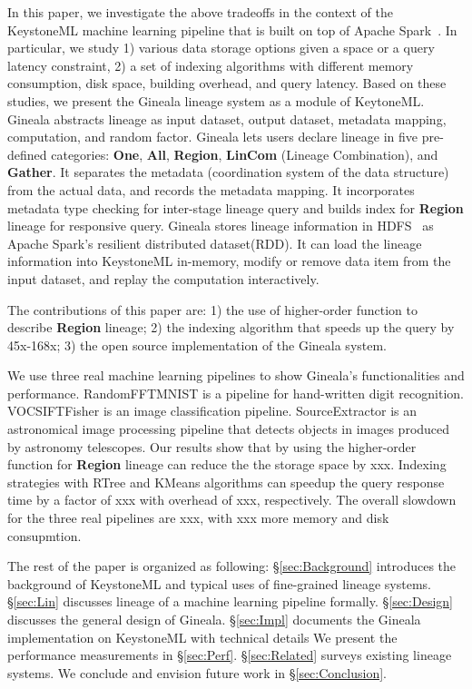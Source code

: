 \documentclass{sig-alternate}
\begin{document}
In this paper, we investigate the above tradeoffs in the context of the KeystoneML machine learning pipeline that is built on
top of Apache Spark~\cite{zaharia12}. In particular, we study 1) various data storage options given a space or a query latency constraint, 
2) a set of indexing algorithms with different memory consumption, disk space, building overhead, and query latency.
Based on these studies, we present the Gineala lineage system as a module of KeytoneML. 
Gineala abstracts lineage as input dataset, output dataset, metadata mapping, computation, and random factor. 
Gineala lets users declare lineage in five pre-defined categories: {\bf One}, {\bf All}, {\bf Region}, {\bf LinCom} (Lineage Combination), and {\bf Gather}.
It separates the metadata (coordination system of the data structure) from the actual data, and records the metadata mapping. 
It incorporates metadata type checking for inter-stage lineage query and builds index for {\bf Region} lineage for responsive query.
Gineala stores lineage information in HDFS~\cite{shvachko10} as Apache Spark's resilient distributed dataset(RDD). 
It can load the lineage information into KeystoneML in-memory, modify or remove data item from the input dataset, and replay
the computation interactively.

The contributions of this paper are: 
1) the use of higher-order function to describe {\bf Region} lineage;
2) the indexing algorithm that speeds up the query by 45x-168x;
3) the open source implementation of the Gineala system.

We use three real machine learning pipelines to show Gineala's functionalities and performance. 
RandomFFTMNIST is a pipeline for hand-written digit recognition. 
VOCSIFTFisher is an image classification pipeline.
SourceExtractor is an astronomical image processing pipeline that detects objects in images produced by astronomy telescopes.
Our results show that by using the higher-order function for {\bf Region} lineage can reduce the the storage space by xxx. 
Indexing strategies with RTree and KMeans algorithms can speedup the query response time by a factor of xxx with overhead of xxx, respectively.
The overall slowdown for the three real pipelines are xxx, with xxx more memory and disk consupmtion.

The rest of the paper is organized as following: 
\S\ref{sec:Background} introduces the background of KeystoneML and typical uses of fine-grained lineage systems. 
\S\ref{sec:Lin} discusses lineage of a machine learning pipeline formally.
\S\ref{sec:Design} discusses the general design of Gineala.
\S\ref{sec:Impl} documents the Gineala implementation on KeystoneML with technical details
We present the performance measurements in \S\ref{sec:Perf}.
\S\ref{sec:Related} surveys existing lineage systems.
We conclude and envision future work in \S\ref{sec:Conclusion}.
\end{document}
